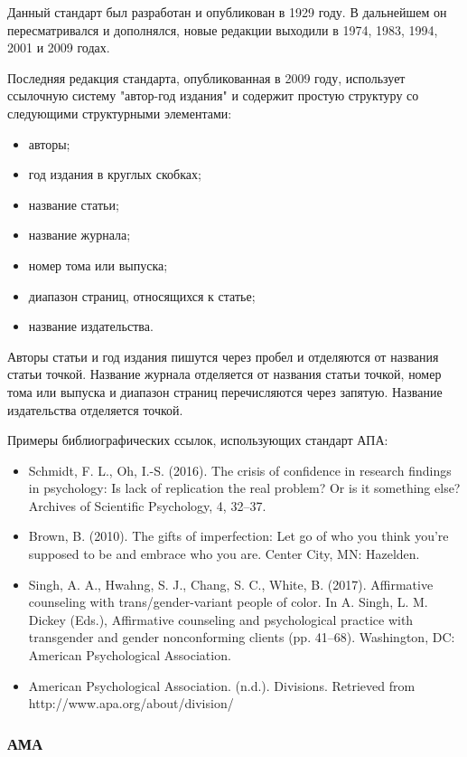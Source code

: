 Данный стандарт был разработан и опубликован в 1929 году. В дальнейшем он пересматривался и дополнялся, новые редакции выходили в 1974, 1983, 1994, 2001 и 2009 годах.

Последняя редакция стандарта, опубликованная в 2009 году, использует ссылочную систему "автор-год издания" и содержит простую структуру со следующими структурными элементами:
\begin{itemize}
	\item авторы;
	\item год издания в круглых скобках;
	\item название статьи;
	\item название журнала;
	\item номер тома или выпуска;
	\item диапазон страниц, относящихся к статье;
	\item название издательства.
\end{itemize}

Авторы статьи и год издания пишутся через пробел и отделяются от названия статьи точкой. Название журнала отделяется от названия статьи точкой, номер тома или выпуска и диапазон страниц перечисляются через запятую. Название издательства отделяется точкой.

Примеры библиографических ссылок, использующих стандарт АПА:
\begin{itemize}
	\item Schmidt, F. L., Oh, I.-S. (2016). The crisis of confidence in research findings in psychology: Is lack of replication the real problem? Or is it something else? Archives of Scientific Psychology, 4, 32–37.
	\item Brown, B. (2010). The gifts of imperfection: Let go of who you think you're supposed to be and embrace who you are. Center City, MN: Hazelden.
	\item Singh, A. A., Hwahng, S. J., Chang, S. C., White, B. (2017). Affirmative counseling with trans/gender-variant people of color. In A. Singh, L. M. Dickey (Eds.), Affirmative counseling and psychological practice with transgender and gender nonconforming clients (pp. 41–68). Washington, DC: American Psychological Association.
	\item American Psychological Association. (n.d.). Divisions. Retrieved from http://www.apa.org/about/division/
\end{itemize}

\subsubsection{АМА}

